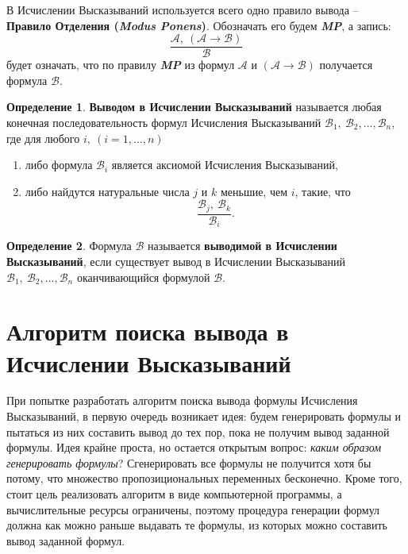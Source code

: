 \documentclass[a4paper,12pt]{article}
\theoremstyle{definition}
\newtheorem{definition}{Определение}
\begin{document}
	В Исчислении Высказываний используется всего одно правило вывода – \textbf{Правило Отделения (\textit{Modus Ponens})}. Обозначать его будем \textbf{\textit{MP}}, а запись:
	\[ \frac{ \mathcal{A},\: \left( \mathcal{A} \to \mathcal{B}\right) }
	{\mathcal{B}} \]
	будет означать, что по правилу \textbf{\textit{MP}} из формул $ \mathcal{A} $ и $ \left( \mathcal{A} \to \mathcal{B}\right) $ получается формула $ {\mathcal{B}} $.
	
	\begin{definition}
		\textbf{Выводом в Исчислении Высказываний} называется любая конечная последовательность формул Исчисления Высказываний	
		$ \mathcal{B}_{1},\:\mathcal{B}_{2},...,\mathcal{B}_{n} $, где для любого $ i,\: \left( i = 1,...,n \right)  $
		\begin{enumerate}
			\item либо формула $ \mathcal{B}_{i} $ является аксиомой Исчисления Высказываний,
			\item либо найдутся натуральные числа $ j $ и $ k $ меньшие, чем $ i $, такие, что 
			\[ \frac{ \mathcal{B}_{j},\: \mathcal{B}_{k} }
			{\mathcal{B}_{i}} .\]
		\end{enumerate}	
	\end{definition}
	
	\begin{definition}
		Формула $ \mathcal{B} $ называется \textbf{выводимой в Исчислении Высказываний}, если существует вывод в Исчислении Высказываний $ \mathcal{B}_{1},\:\mathcal{B}_{2},...,\mathcal{B}_{n} $ оканчивающийся формулой $ \mathcal{B} $.	
	\end{definition}
	
	
	
	\section{Алгоритм поиска вывода в Исчислении Высказываний}
	При попытке разработать алгоритм поиска вывода формулы Исчисления Высказываний, в первую очередь возникает идея: будем генерировать формулы и пытаться из них составить вывод до тех пор, пока не получим вывод заданной формулы. Идея крайне проста, но остается открытым вопрос: \textit{каким образом генерировать формулы}? Сгенерировать все формулы не получится хотя бы потому, что множество пропозициональных переменных бесконечно. Кроме того, стоит цель реализовать алгоритм в виде компьютерной программы, а вычислительные ресурсы ограничены, поэтому процедура генерации формул должна как можно раньше выдавать те формулы, из которых можно составить вывод заданной формул. 
\end{document}

